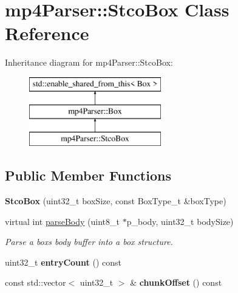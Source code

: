 \hypertarget{classmp4_parser_1_1_stco_box}{}\section{mp4\+Parser\+::Stco\+Box Class Reference}
\label{classmp4_parser_1_1_stco_box}
Inheritance diagram for mp4\+Parser\+::Stco\+Box\+:\begin{figure}[H]
\begin{center}
\leavevmode
\includegraphics[height=3.000000cm]{classmp4_parser_1_1_stco_box}
\end{center}
\end{figure}
\subsection*{Public Member Functions}
\begin{DoxyCompactItemize}
\item 
\mbox{\label{classmp4_parser_1_1_stco_box_a773d7a90643806a8c5e55cd1171b21ef}} 
{\bfseries Stco\+Box} (uint32\+\_\+t box\+Size, const Box\+Type\+\_\+t \&box\+Type)
\item 
virtual int \mbox{\hyperlink{classmp4_parser_1_1_stco_box_a94fe370219871eb204611637fa482449}{parse\+Body}} (uint8\+\_\+t $\ast$p\+\_\+body, uint32\+\_\+t body\+Size)
\begin{DoxyCompactList}\small\item\em Parse a box\textquotesingle{}s body buffer into a box structure. \end{DoxyCompactList}\item 
\mbox{\label{classmp4_parser_1_1_stco_box_acb45724a6fd0ce04a7d1379e0cc8309e}} 
uint32\+\_\+t {\bfseries entry\+Count} () const
\item 
\mbox{\label{classmp4_parser_1_1_stco_box_a72487183946bce734d67aac01707f893}} 
const std\+::vector$<$ uint32\+\_\+t $>$ \& {\bfseries chunk\+Offset} () const
\end{DoxyCompactItemize}
